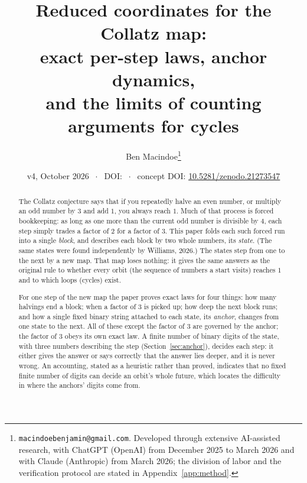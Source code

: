 \documentclass[11pt]{article}
\title{Reduced coordinates for the Collatz map:\\ exact per-step laws, anchor dynamics,\\ and the limits of counting arguments for cycles}
\author{Ben Macindoe\thanks{\texttt{macindoebenjamin@gmail.com}. Developed through extensive AI-assisted research, with ChatGPT (OpenAI) from December 2025 to March 2026 and with Claude (Anthropic) from March 2026; the division of labor and the verification protocol are stated in Appendix~\ref{app:method}.}}
\date{v4, October 2026 $\;\cdot\;$ DOI: \vfourdoi{} $\;\cdot\;$ concept DOI: \href{https://doi.org/10.5281/zenodo.21273547}{10.5281/zenodo.21273547}}
\theoremstyle{remark}
\begin{document}
\maketitle

\begin{abstract}
The Collatz conjecture says that if you repeatedly halve an even number, or multiply an odd number by $3$ and add $1$, you always reach $1$. Much of that process is forced bookkeeping: as long as one more than the current odd number is divisible by $4$, each step simply trades a factor of $2$ for a factor of $3$. This paper folds each such forced run into a single \emph{block}, and describes each block by two whole numbers, its \emph{state}. (The same states were found independently by Williams, 2026.) The states step from one to the next by a new map. That map loses nothing: it gives the same answers as the original rule to whether every orbit (the sequence of numbers a start visits) reaches $1$ and to which loops (cycles) exist.

For one step of the new map the paper proves exact laws for four things: how many halvings end a block; when a factor of $3$ is picked up; how deep the next block runs; and how a single fixed binary string attached to each state, its \emph{anchor}, changes from one state to the next. All of these except the factor of $3$ are governed by the anchor; the factor of $3$ obeys its own exact law. A finite number of binary digits of the state, with three numbers describing the step (Section~\ref{sec:anchor}), decides each step: it either gives the answer or says correctly that the answer lies deeper, and it is never wrong. An accounting, stated as a heuristic rather than proved, indicates that no fixed finite number of digits can decide an orbit's whole future, which locates the difficulty in where the anchors' digits come from.


\end{abstract}
\end{document}
